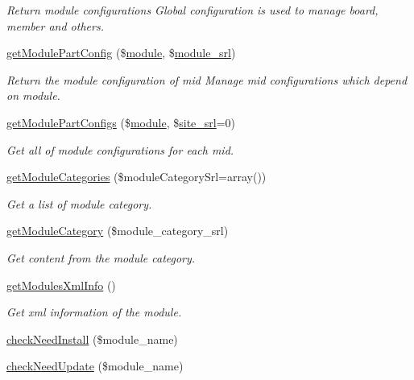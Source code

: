 \begin{DoxyCompactItemize}
\begin{DoxyCompactList}\small\item\em Return module configurations Global configuration is used to manage board, member and others. \end{DoxyCompactList}\item 
\hyperlink{classmoduleModel_acfd93d46c26d88c3833b0801085e69ba}{get\-Module\-Part\-Config} (\$\hyperlink{classmodule}{module}, \$\hyperlink{ko_8install_8php_a370bb6450fab1da3e0ed9f484a38b761}{module\-\_\-srl})
\begin{DoxyCompactList}\small\item\em Return the module configuration of mid Manage mid configurations which depend on module. \end{DoxyCompactList}\item 
\hyperlink{classmoduleModel_a3e50f170f709853c8adf5c8f759e08ca}{get\-Module\-Part\-Configs} (\$\hyperlink{classmodule}{module}, \$\hyperlink{ko_8install_8php_a8b1406b4ad1048041558dce6bfe89004}{site\-\_\-srl}=0)
\begin{DoxyCompactList}\small\item\em Get all of module configurations for each mid. \end{DoxyCompactList}\item 
\hyperlink{classmoduleModel_a253e39c41e241e2f3fa914ce5d915963}{get\-Module\-Categories} (\$module\-Category\-Srl=array())
\begin{DoxyCompactList}\small\item\em Get a list of module category. \end{DoxyCompactList}\item 
\hyperlink{classmoduleModel_a75669086647f78470306c840c22f36b1}{get\-Module\-Category} (\$module\-\_\-category\-\_\-srl)
\begin{DoxyCompactList}\small\item\em Get content from the module category. \end{DoxyCompactList}\item 
\hyperlink{classmoduleModel_ab0740093a121db65a8d65777fdcd8f00}{get\-Modules\-Xml\-Info} ()
\begin{DoxyCompactList}\small\item\em Get xml information of the module. \end{DoxyCompactList}\item 
\hyperlink{classmoduleModel_a0a2303f1634b4937509e9b21e811d1ad}{check\-Need\-Install} (\$module\-\_\-name)
\item 
\hyperlink{classmoduleModel_adb7f7c6facce819f69ae5e29db2018cc}{check\-Need\-Update} (\$module\-\_\-name)

\end{DoxyCompactItemize}
